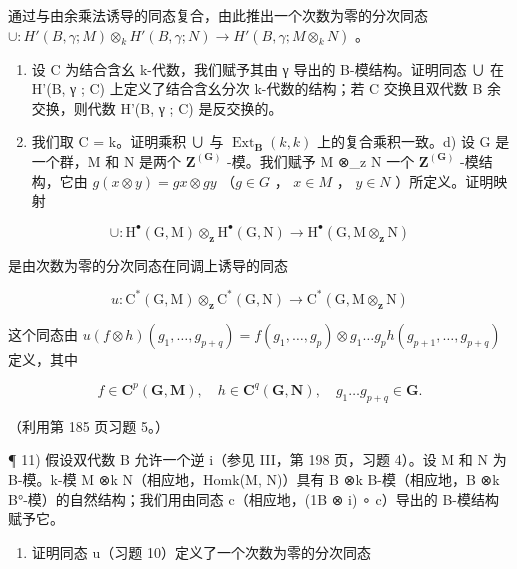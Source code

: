 通过与由余乘法诱导的同态复合，由此推出一个次数为零的分次同态 \(\cup: H'(B, \gamma; M) \otimes_k H'(B, \gamma; N) \to H'(B, \gamma; M \otimes_k N)\) 。

\begin{enumerate}
\def\labelenumi{\alph{enumi})}
\setcounter{enumi}{1}
\item
  设 C 为结合含幺 k-代数，我们赋予其由 γ 导出的 B-模结构。证明同态 ∪ 在 H'(B, γ ; C) 上定义了结合含幺分次 k-代数的结构；若 C 交换且双代数 B 余交换，则代数 H'(B, γ ; C) 是反交换的。
\item
  我们取 C = k。证明乘积 ∪ 与 \(\operatorname{Ext}_{\mathbf{B}}(k, k)\) 上的复合乘积一致。d) 设 G 是一个群，M 和 N 是两个 \(\mathbf{Z}^{(\mathbf{G})}\) -模。我们赋予 M ⊗\_z N 一个 \(\mathbf{Z}^{(\mathbf{G})}\) -模结构，它由 \(g(x \otimes y) = gx \otimes gy\) （\(g \in G\) ， \(x \in M\) ， \(y \in N\) ）所定义。证明映射
\end{enumerate}

\[
\cup : \mathrm{H} ^ {\bullet} (\mathrm{G}, \mathrm{M}) \otimes_ {\mathbf {z}} \mathrm{H} ^ {\bullet} (\mathrm{G}, \mathrm{N}) \rightarrow \mathrm{H} ^ {\bullet} (\mathrm{G}, \mathrm{M} \otimes_ {\mathbf {z}} \mathrm{N})
\]

是由次数为零的分次同态在同调上诱导的同态

\[
u: \mathrm{C} ^ {*} (\mathrm{G}, \mathrm{M}) \otimes_ {\mathbf {z}} \mathrm{C} ^ {*} (\mathrm{G}, \mathrm{N}) \rightarrow \mathrm{C} ^ {*} (\mathrm{G}, \mathrm{M} \otimes_ {\mathbf {z}} \mathrm{N})
\]

这个同态由 \(u(f \otimes h)(g_1, \ldots, g_{p+q}) = f(g_1, \ldots, g_p) \otimes g_1 \ldots g_p h(g_{p+1}, \ldots, g_{p+q})\) 定义，其中

\[
f \in \mathbf {C} ^ {p} (\mathbf {G}, \mathbf {M}), \quad h \in \mathbf {C} ^ {q} (\mathbf {G}, \mathbf {N}), \quad g _ {1} \dots g _ {p + q} \in \mathbf {G}.
\]

（利用第 185 页习题 5。）

¶ 11) 假设双代数 B 允许一个逆 i（参见 III，第 198 页，习题 4）。设 M 和 N 为 B-模。k-模 M ⊗k N（相应地，Homk(M, N)）具有 B ⊗k B-模（相应地，B ⊗k B°-模）的自然结构；我们用由同态 c（相应地，(1B ⊗ i) ∘ c）导出的 B-模结构赋予它。

\begin{enumerate}
\def\labelenumi{\alph{enumi})}
\tightlist
\item
  证明同态 u（习题 10）定义了一个次数为零的分次同态
\end{enumerate}

